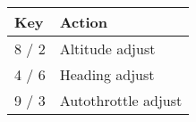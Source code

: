 \begin{tabular}{|l|l|}\hline
 Key           &         Action\\\hline
    8 / 2      &         Altitude adjust\\
    4 / 6      &         Heading adjust\\
    9 / 3      &         Autothrottle adjust \\\hline
 \end{tabular}

